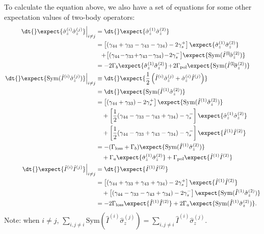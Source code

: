 \documentclass[]{report}
\begin{document}
To calculate the equation above, we also have a set of equations for some other expectation values of two-body operators:
\begin{align}
\left.\dt{}\expect{\hat{\sigma}_z^{(i)} \hat{\sigma}_z^{(j)}}\right|_{i\neq j} &= \dt{}\expect{\hat{\sigma}_z^{(1)} \hat{\sigma}_z^{(2)}}\\
&= \left[ (\gamma_{44}+\gamma_{33}-\gamma_{43}-\gamma_{34})  -2\gamma_s^+\right]\expect{\hat{\sigma}_z^{(1)} \hat{\sigma}_z^{(2)}}\nonumber\\
&\quad \!\!+\! \left[ (\gamma_{44}\!-\!\gamma_{33}\!+\!\gamma_{43}\!-\!\gamma_{34})  \!-\! 2\gamma_s^-\right]\! \expect{\mathrm{Sym}(\hat{I}^{(\!1\!)}\!\hat{\sigma}_z^{(2)} )}\\
&=-2\Gamma_b \expect{\hat{\sigma}_z^{(1)} \hat{\sigma}_z^{(2)}} \!+\! 2\Gamma_{\rm pol} \expect{\mathrm{Sym}(\hat{I}^{(\!1\!)}\!\hat{\sigma}_z^{(2)} )}\\
\left.\dt{}\expect{\mathrm{Sym}(\hat{I}^{(i)}\hat{\sigma}_z^{(j)} ) }\right|_{i\neq j} &\equiv \dt{}\expect{\frac{1}{2}\left( \hat{I}^{(i)}\hat{\sigma}_z^{(j)}+\hat{\sigma}_z^{(i)}\hat{I}^{(j)} \right) }\\
&= \dt{}\expect{\mathrm{Sym}( \hat{I}^{(1)}\hat{\sigma}_z^{(2)} ) }\\
&= \left[(\gamma_{44}+\gamma_{33})-2\gamma_s^+ \right] \expect{\mathrm{Sym}( \hat{I}^{(1)}\hat{\sigma}_z^{(2)} ) }\nonumber\\
&\quad + \left[ \frac{1}{2}(\gamma_{44}-\gamma_{33}-\gamma_{43}+\gamma_{34})  -\gamma_s^-\right]\expect{\hat{\sigma}_z^{(1)} \hat{\sigma}_z^{(2)}} \nonumber\\
&\quad + \left[ \frac{1}{2}(\gamma_{44}-\gamma_{33}+\gamma_{43}-\gamma_{34})  -\gamma_s^-\right]\expect{\hat{I}^{(1)} \hat{I}^{(2)}}\\
&= -(\Gamma_{\rm loss}+\Gamma_b )\expect{\mathrm{Sym}( \hat{I}^{(1)}\hat{\sigma}_z^{(2)} ) } \nonumber\\
&\quad +\Gamma_a \expect{\hat{\sigma}_z^{(1)} \hat{\sigma}_z^{(2)}} + \Gamma_{\rm pol}\expect{\hat{I}^{(1)} \hat{I}^{(2)}}\\
\left.\dt{}\expect{\hat{I}^{(i)} \hat{I}^{(j)}}\right|_{i\neq j} &= \dt{}\expect{\hat{I}^{(1)} \hat{I}^{(2)}}\\
&= \left[ (\gamma_{44}+\gamma_{33}+\gamma_{43}+\gamma_{34})  -2\gamma_s^+\right]\expect{\hat{I}^{(1)} \hat{I}^{(2)}}\nonumber\\
&\quad +\left[ (\gamma_{44}-\gamma_{33}-\gamma_{43}+\gamma_{34})  -2\gamma_s^-\right]\expect{\mathrm{Sym}(\hat{I}^{(1)} \hat{\sigma}_z^{(2)})} \nonumber\\
&= -2\Gamma_{\rm loss}\expect{\hat{I}^{(1)} \hat{I}^{(2)}}+2\Gamma_a \expect{\mathrm{Sym}(\hat{I}^{(1)} \hat{\sigma}_z^{(2)})}.
\end{align}
Note: when $ i\neq j $, $ \sum_{i,j\neq i}\mathrm{Sym}(\hat{I}^{(i)}\hat{\sigma}_z^{(j)} )= \sum_{i,j\neq i}\hat{I}^{(i)}\hat{\sigma}_z^{(j)}$.
\end{document}

